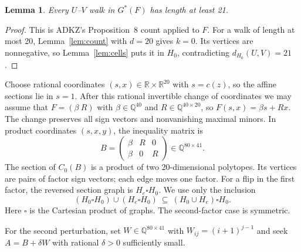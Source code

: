 \documentclass[11pt]{article}
\newtheorem{lemma}[theorem]{Lemma}
\theoremstyle{remark}
\newcommand{\Q}{\mathbb Q}
\newcommand{\R}{\mathbb R}
\begin{document}
\begin{lemma}\label{lem:factor}
Every $U$--$V$ walk in $G^*(F)$ has length at least 21.
\end{lemma}
\begin{proof}
This is ADKZ's Proposition~8 count applied to $F$.
For a walk of length at most 20, Lemma~\ref{lem:count} with $d=20$
gives $k=0$. Its vertices are nonnegative, so Lemma~\ref{lem:cells} puts it
in $H_0$, contradicting $d_{H_0}(U,V)=21$.

\end{proof}

Choose rational coordinates $(s,x)\in\R\times\R^{20}$ with $s=c(z)$,
so the affine sections lie in $s=1$. After this rational invertible
change of coordinates we may assume that
$F=(\beta\ R)$ with $\beta\in\Q^{40}$ and $R\in\Q^{40\times20}$,
so $F(s,x)=\beta s+Rx$. The change preserves all sign vectors and
nonvanishing maximal minors. In product coordinates $(s,x,y)$,
the inequality matrix is
\[
 B=\begin{pmatrix}\beta&R&0\\\beta&0&R\end{pmatrix}\in\Q^{80\times41}.
\]
The section of $C_0(B)$ is a product of two 20-dimensional polytopes.
Its vertices are pairs of factor sign vectors; each edge moves one factor.
For a flip in the first factor, the reversed section graph is
$H_e\square H_0$. We use only the inclusion
\[
 (H_0\square H_0)\cup(H_e\square H_0)
 \ \subseteq\ (H_0\cup H_e)\square H_0.
\]
Here $\square$ is the Cartesian product of graphs. The second-factor case
is symmetric.


For the second perturbation, set $W\in\Q^{80\times41}$ with
$W_{ij}=(i+1)^{j-1}$ and seek
$A=B+\delta W$ with rational $\delta>0$ sufficiently small.
\end{document}
